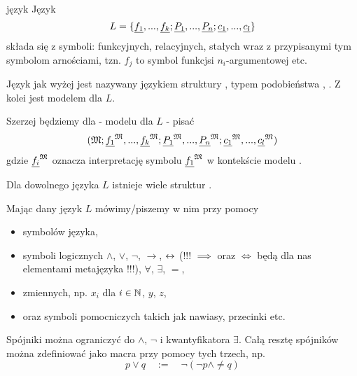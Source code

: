 \begin{definition}{język}{}
  Język
  $$L=\{\underline{f_1},...,\underline{f_k};\underline{P_1},..., \underline{P_n}; \underline{c_1},...,\underline{c_l}\}$$
  składa się z symboli: funkcyjnych, relacyjnych, stałych wraz z przypisanymi tym symbolom arnościami, tzn. $f_j$ to symbol funkcjsi $n_i$-argumentowej etc.
\end{definition}

Język jak wyżej jest nazywany językiem struktury \Mm{}, typem podobieństwa \Mm{}, . Z kolei \Mm{} jest modelem dla $L$.

Szerzej będziemy dla \Mm{} - modelu dla $L$ - pisać
$$(\mathfrak{M}; \underline{f_1}^{\mathfrak{M}}, ..., \underline{f_k}^{\mathfrak{M}}; \underline{P_1}^{\mathfrak{M}},...,\underline{P_n}^{\mathfrak{M}}; \underline{c_1}^{\mathfrak{M}},...,\underline{c_l}^{\mathfrak{M}})$$
gdzie $\underline{f_i}^{\mathfrak{M}}$ oznacza interpretację symbolu $\underline{f_1}^{\mathfrak{M}}$ w kontekście modelu \Mm.

\begin{remark}{}{}
  Dla dowolnego języka $L$ istnieje wiele struktur \Mm.
\end{remark}

Mając dany język $L$ mówimy/piszemy w nim przy pomocy
\begin{itemize}
  \item symbolów języka,
  \item symboli logicznych $\land$, $\lor$, $\neg$, $\to$, $\leftrightarrow$ (!!! $\implies$ oraz $\iff$ będą dla nas elementami metajęzyka !!!), $\forall$, $\exists$, $=$,
  \item zmiennych, np. $x_i$ dla $i\in \mathbb{N}$, $y$, $z$,
  \item oraz symboli pomocniczych takich jak nawiasy, przecinki etc.
\end{itemize}

\begin{remark}{}{}
  Spójniki można ograniczyć do $\land$, $\neg$ i kwantyfikatora $\exists$. Całą resztę spójników można zdefiniować jako macra przy pomocy tych trzech, np.
  $$p\lor q\quad :=\quad \neg(\neg p\land \neq q)$$
\end{remark}

